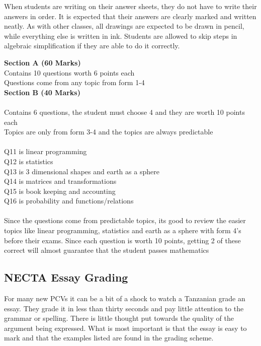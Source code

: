       When students are writing on their answer sheets, they do not have to write their answers in order.  It is expected that their answers are clearly marked and written neatly.  As with other classes, all drawings are expected to be drawn in pencil, while everything else is written in ink.  Students are allowed to skip steps in algebraic simplification if they are able to do it correctly. 
\begin{flushleft}
    
\textbf{Section A (60 Marks) }\\
Contains 10 questions worth 6 points each\\
Questions come from any topic from form 1-4\\
 
\textbf{Section B (40 Marks)} \\
\\
Contains 6 questions, the student must choose 4 and they are worth 10 points each\\
Topics are only from form 3-4 and the topics are always predictable\\
\\
Q11 is linear programming\\
Q12 is statistics\\
Q13 is 3 dimensional shapes and earth as a sphere\\
Q14 is matrices and transformations\\
Q15 is book keeping and accounting\\
Q16 is probability and functions/relations\\
\\
Since the questions come from predictable topics, its good to review the easier topics like linear programming, statistics and earth as a sphere with form 4's before their exams.  Since each question is worth 10 points, getting 2 of these correct will almost guarantee that the student passes mathematics\\

\end{flushleft}  
 
\subsection{NECTA Essay Grading} 
  For many new PCVs it can be a bit of a shock to watch a Tanzanian grade an essay.  They grade it in less than thirty seconds and pay little attention to the grammar or spelling.  There is little thought put towards the quality of the argument being expressed.  What is most important is that the essay is easy to mark and that the examples listed are found in the grading scheme.   

